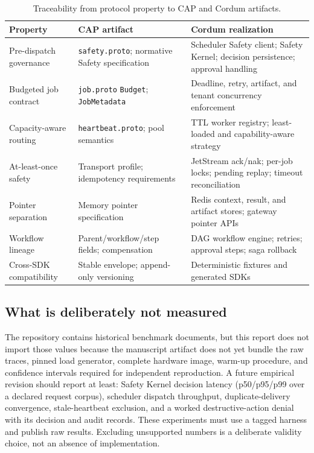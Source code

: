 \begin{table}[t]
\centering
\caption{Traceability from protocol property to CAP and Cordum artifacts.}
\label{tab:traceability}
\small
\begin{tabular}{@{}p{}p{}p{}@{}}
\toprule
Property & CAP artifact & Cordum realization \\
\midrule
Pre-dispatch governance & \texttt{safety.proto}; normative Safety specification & Scheduler Safety client; Safety Kernel; decision persistence; approval handling \\
Budgeted job contract & \texttt{job.proto} \texttt{Budget}; \texttt{JobMetadata} & Deadline, retry, artifact, and tenant concurrency enforcement \\
Capacity-aware routing & \texttt{heartbeat.proto}; pool semantics & TTL worker registry; least-loaded and capability-aware strategy \\
At-least-once safety & Transport profile; idempotency requirements & JetStream ack/nak; per-job locks; pending replay; timeout reconciliation \\
Pointer separation & Memory pointer specification & Redis context, result, and artifact stores; gateway pointer APIs \\
Workflow lineage & Parent/workflow/step fields; compensation & DAG workflow engine; retries; approval steps; saga rollback \\
Cross-SDK compatibility & Stable envelope; append-only versioning & Deterministic fixtures and generated SDKs \\
\bottomrule
\end{tabular}
\end{table}

\subsection{What is deliberately not measured}

The repository contains historical benchmark documents, but this report does not import those values because the manuscript artifact does not yet bundle the raw traces, pinned load generator, complete hardware image, warm-up procedure, and confidence intervals required for independent reproduction. A future empirical revision should report at least: Safety Kernel decision latency (p50/p95/p99 over a declared request corpus), scheduler dispatch throughput, duplicate-delivery convergence, stale-heartbeat exclusion, and a worked destructive-action denial with its decision and audit records. These experiments must use a tagged harness and publish raw results. Excluding unsupported numbers is a deliberate validity choice, not an absence of implementation.
